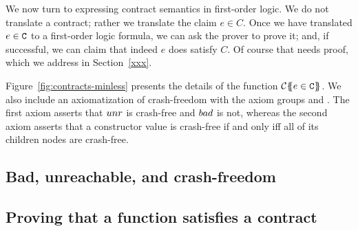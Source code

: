 We now turn to expressing contract semantics in first-order logic. 
We do not translate a contract; rather we translate the claim $e \in C$.
Once we have translated $e \in {\tt C}$ to a first-order logic formula, we can
ask the prover to prove it; and, if successful, we can claim that indeed
$e$ does satisfy $C$.  Of course that needs proof, which we address in Section~\ref{xxx}.

Figure~\ref{fig:contracts-minless} presents the details of the 
function ${\cal C}\{\!\!\{e \in {\tt C}\}\!\!\}$.  We also include 
an axiomatization of crash-freedom with the axiom groups  and 
. The first axiom asserts that $\mathop{unr}$ is crash-free and $\mathop{bad}$ is not, 
whereas the second axiom asserts that a constructor value is crash-free if and only iff 
all of its children nodes are crash-free. 

\subsection{Bad, unreachable, and crash-freedom}


\subsection{Proving that a function satisfies a contract}

